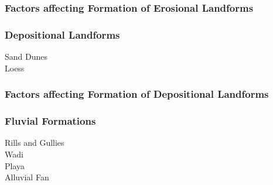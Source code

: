 \documentclass[../../main]{subfiles}
\begin{document}
	\subsubsection{Factors affecting Formation of Erosional Landforms}

	\subsubsection{Depositional Landforms}

	\begin{description}
		\item[Sand Dunes]
		\item[Loess]
	\end{description}

	\subsubsection{Factors affecting Formation of Depositional Landforms}

	\subsubsection{Fluvial Formations}

	\begin{description}
		\item[Rills and Gullies]
		\item[Wadi]
		\item[Playa]
		\item[Alluvial Fan]
	\end{description}
\end{document}
